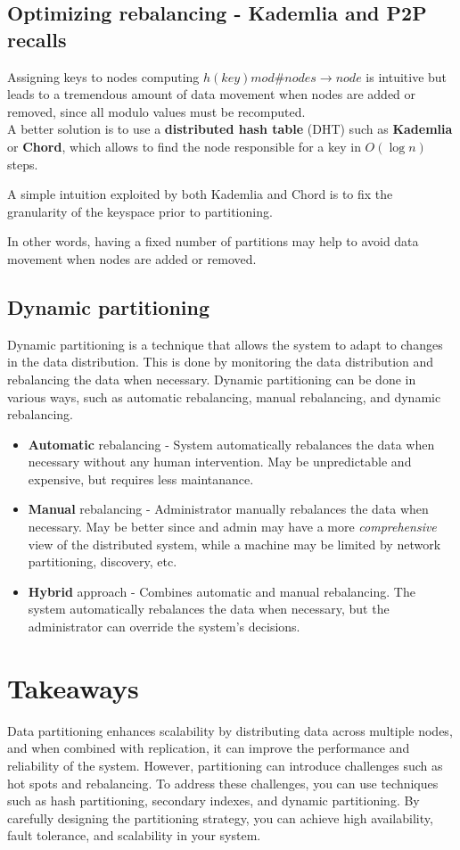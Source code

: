 \subsection{Optimizing rebalancing - Kademlia and P2P recalls}

Assigning keys to nodes computing $h(key) mod \#{nodes} \rightarrow node$ is intuitive but leads to a tremendous amount of data movement when nodes are added or removed, since all modulo values must be recomputed.\\
A better solution is to use a \textbf{distributed hash table} (DHT) such as \textbf{Kademlia} or \textbf{Chord}, which allows to find the node responsible for a key in $O(\log n)$ steps.

A simple intuition exploited by both Kademlia and Chord is to fix the granularity of the keyspace prior to partitioning.

In other words, having a fixed number of partitions may help to avoid data movement when nodes are added or removed.


\subsection{Dynamic partitioning}
Dynamic partitioning is a technique that allows the system to adapt to changes in the data distribution. This is done by monitoring the data distribution and rebalancing the data when necessary. Dynamic partitioning can be done in various ways, such as automatic rebalancing, manual rebalancing, and dynamic rebalancing.

\begin{itemize}
   \item \textbf{Automatic} rebalancing - System automatically rebalances the data when necessary without any human intervention.
   May be unpredictable and expensive, but requires less maintanance.
   \item \textbf{Manual} rebalancing - Administrator manually rebalances the data when necessary. May be better since and admin may have a more \textit{comprehensive} view of the distributed system, while a machine may be limited by network partitioning, discovery, etc.
   \item \textbf{Hybrid} approach - Combines automatic and manual rebalancing. The system automatically rebalances the data when necessary, but the administrator can override the system's decisions. 
\end{itemize}


\section{Takeaways}
Data partitioning enhances scalability by distributing data across multiple nodes, and when combined with replication, it can improve the performance and reliability of the system. However, partitioning can introduce challenges such as hot spots and rebalancing. To address these challenges, you can use techniques such as hash partitioning, secondary indexes, and dynamic partitioning. By carefully designing the partitioning strategy, you can achieve high availability, fault tolerance, and scalability in your system.